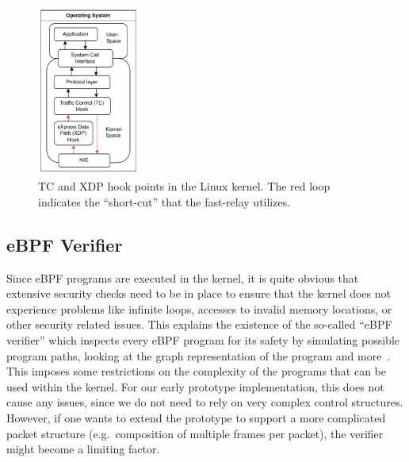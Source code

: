 \begin{figure}[H]
    \centering
    \includegraphics[width=0.3\textwidth]{figures/02_background/hook-point-locations.drawio.pdf}
    \caption[Hook points within network stack]{TC and XDP hook points in the Linux kernel.
    The red loop indicates the ``short-cut'' that the fast-relay utilizes.
    }\label{fig:ebpf-hooks}
\end{figure}


\subsection{eBPF Verifier}
Since eBPF programs are executed in the kernel, it is quite obvious that extensive
security checks need to be in place to ensure that the kernel does not experience 
problems like infinite loops, accesses to invalid memory locations, or other security 
related issues.
This explains the existence of the so-called ``eBPF verifier'' which inspects 
every eBPF program for its safety by simulating possible program paths, 
looking at the graph representation of the program and more~\parencite{ebpf-verifier}.
This imposes some restrictions on the complexity of the programs that can be 
used within the kernel.
For our early prototype implementation, this does not cause any issues, since we do not need 
to rely on very complex control structures.
However, if one wants to extend the prototype to support a more complicated packet structure
(e.g.~composition of multiple frames per packet), the verifier might become a limiting factor.


